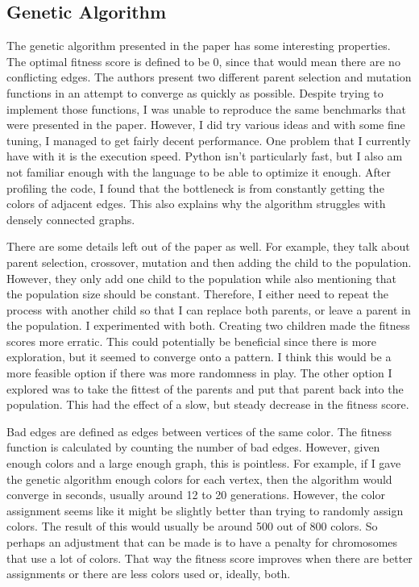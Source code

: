 \documentclass[12]{article}
\begin{document}
\subsection{Genetic Algorithm}
The genetic algorithm presented in the paper has some interesting properties. The optimal fitness score is defined to be 0, since that would mean there are no conflicting edges.  The authors present two different parent selection and mutation functions in an attempt to converge as quickly as possible. Despite trying to implement those functions, I was unable to reproduce the same benchmarks that were presented in the paper. However, I did try various ideas and with some fine tuning, I managed to get fairly decent performance. One problem that I currently have with it is the execution speed. Python isn't particularly fast, but I also am not familiar enough with the language to be able to optimize it enough. After profiling the code, I found that the bottleneck is from constantly getting the colors of adjacent edges. This also explains why the algorithm struggles with densely connected graphs.

There are some details left out of the paper as well. For example, they talk about parent selection, crossover, mutation and then adding the child to the population. However, they only add one child to the population while also mentioning that the population size should be constant. Therefore, I either need to repeat the process with another child so that I can replace both parents, or leave a parent in the population. I experimented with both. Creating two children made the fitness scores more erratic. This could potentially be beneficial since there is more exploration, but it seemed to converge onto a pattern. I think this would be a more feasible option if there was more randomness in play. The other option I explored was to take the fittest of the parents and put that parent back into the population. This had the effect of a slow, but steady decrease in the fitness score.

Bad edges are defined as edges between vertices of the same color. The fitness function is calculated by counting the number of bad edges. However, given enough colors and a large enough graph, this is pointless. For example, if I gave the genetic algorithm enough colors for each vertex, then the algorithm would converge in seconds, usually around 12 to 20 generations. However, the color assignment seems like it might be slightly better than trying to randomly assign colors. The result of this would usually be around 500 out of 800 colors. So perhaps an adjustment that can be made is to have a penalty for chromosomes that use a lot of colors. That way the fitness score improves when there are better assignments or there are less colors used or, ideally, both.
\end{document}

